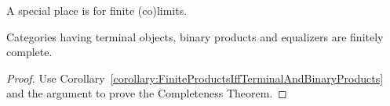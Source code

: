 
A special place is for finite (co)limits.

\begin{proposition}
  Categories having terminal objects, binary products and equalizers
  are finitely complete. 
\end{proposition}

\begin{proof}
  Use
  Corollary~\ref{corollary:FiniteProductsIffTerminalAndBinaryProducts}
  and the argument to prove the Completeness Theorem.
\end{proof}



